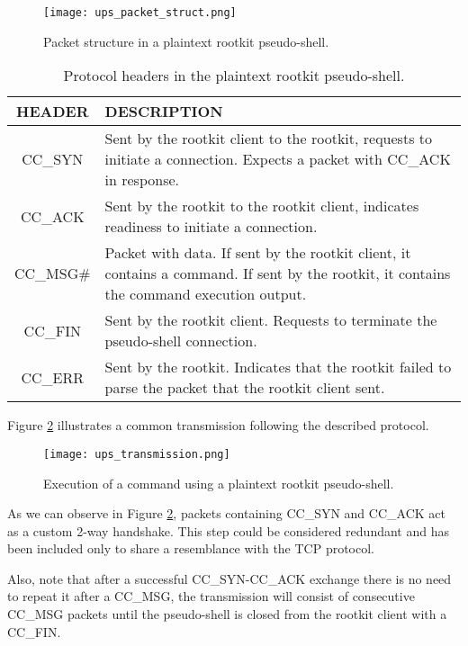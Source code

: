 \begin{figure}[htbp]
	\centering
	\texttt{[image: ups\_packet\_struct.png]}
	\caption{Packet structure in a plaintext rootkit pseudo-shell.}
	\label{fig:ups_packet_struct}
\end{figure}

\begin{table}[htbp]
\begin{tabular}{|c|>{\centering\arraybackslash}p{8cm}|}
\hline
\textbf{HEADER} & \textbf{DESCRIPTION}\\
\hline
\hline
CC\_SYN & Sent by the rootkit client to the rootkit, requests to initiate a connection. Expects a packet with CC\_ACK in response.\\
\hline
CC\_ACK & Sent by the rootkit to the rootkit client, indicates readiness to initiate a connection.\\
\hline
CC\_MSG\# & Packet with data. If sent by the rootkit client, it contains a command. If sent by the rootkit, it contains the command execution output.\\
\hline
CC\_FIN & Sent by the rootkit client. Requests to terminate the pseudo-shell connection.\\
\hline
CC\_ERR & Sent by the rootkit. Indicates that the rootkit failed to parse the packet that the rootkit client sent.\\
\hline
\end{tabular}
\caption{Protocol headers in the plaintext rootkit pseudo-shell.}
\label{table:ups_headers}
\end{table}

Figure \ref{fig:ups_transmission} illustrates a common transmission following the described protocol.

\begin{figure}[htbp]
	\centering
	\texttt{[image: ups\_transmission.png]}
	\caption{Execution of a command using a plaintext rootkit pseudo-shell.}
	\label{fig:ups_transmission}
\end{figure}

As we can observe in Figure \ref{fig:ups_transmission}, packets containing CC\_SYN and CC\_ACK act as a custom 2-way handshake. This step could be considered redundant and has been included only to share a resemblance with the TCP protocol.

Also, note that after a successful CC\_SYN-CC\_ACK exchange there is no need to repeat it after a CC\_MSG, the transmission will consist of consecutive CC\_MSG packets until the pseudo-shell is closed from the rootkit client with a CC\_FIN.


